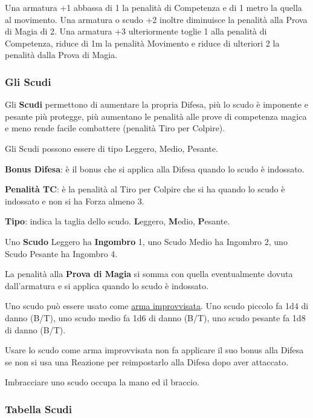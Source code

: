 \begin{multicols}{2}
Una armatura +1 abbassa di 1 la penalità di Competenza e di 1 metro la quella al movimento.
Una armatura o scudo +2 inoltre diminuisce la penalità alla Prova di Magia di 2. Una armatura +3 ulteriormente toglie 1 alla penalità di Competenza, riduce di 1m la penalità Movimento e riduce di ulteriori 2 la penalità dalla Prova di Magia.

\subsubsection{Gli Scudi}

Gli \textbf{Scudi} permettono di aumentare la propria Difesa, più lo scudo è imponente e pesante più protegge, più aumentano le penalità alle prove di competenza magica e meno rende facile combattere (penalità Tiro per Colpire).

Gli Scudi possono essere di tipo Leggero, Medio, Pesante.

\textbf{Bonus Difesa}: è il bonus che si applica alla Difesa quando lo scudo è indossato.

\textbf{Penalità TC}: è la penalità al Tiro per Colpire che si ha quando lo scudo è indossato e non si ha Forza almeno 3.

\textbf{Tipo}: indica la taglia dello scudo. \textbf{L}eggero, \textbf{M}edio, \textbf{P}esante.

Uno \textbf{Scudo} Leggero ha \textbf{Ingombro} 1, uno Scudo Medio ha Ingombro 2, uno Scudo Pesante ha Ingombro 4.

La penalità alla \textbf{Prova di Magia} si somma con quella eventualmente dovuta dall'armatura e si applica quando lo scudo è indossato.

Uno scudo può essere usato come \hyperlink{armaimprovvisata}{arma improvvisata}. Uno scudo piccolo fa 1d4 di danno (B/T), uno scudo medio fa 1d6 di danno (B/T), uno scudo pesante fa 1d8 di danno (B/T).

Usare lo scudo come arma improvvisata non fa applicare il suo bonus alla Difesa se non si usa una Reazione per reimpostarlo alla Difesa dopo aver attaccato.

Imbracciare uno scudo occupa la mano ed il braccio.

\end{multicols}

\subsubsection{Tabella Scudi}

